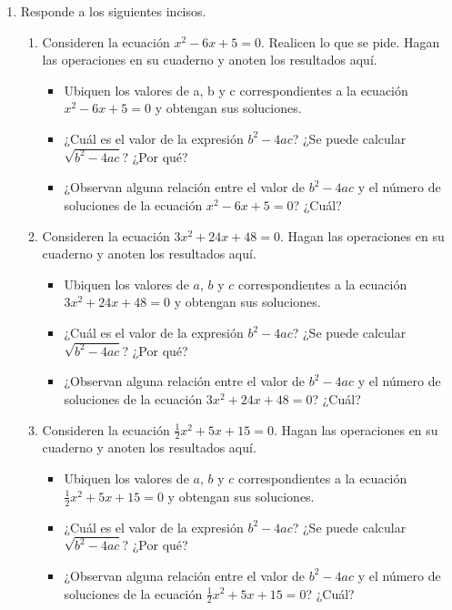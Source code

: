 \documentclass[11pt]{book}
\begin{document}
\begin{enumerate}
    \item Responde a los siguientes incisos.
          \begin{enumerate}
              \item Consideren la ecuación $x^2 - 6x + 5 = 0$. Realicen lo que se pide. Hagan las operaciones en su cuaderno y anoten los resultados aquí.
                    \begin{itemize}
                        \item Ubiquen los valores de a, b y c correspondientes a la ecuación $x^2 - 6x + 5 = 0$ y obtengan sus soluciones.
                        \item ¿Cuál es el valor de la expresión $b^2 - 4ac$? ¿Se puede calcular $\sqrt{b^2 - 4ac}$? ¿Por qué?
                        \item ¿Observan alguna relación entre el valor de $b^2 - 4ac$ y el número de soluciones de la ecuación $x^2 - 6x + 5 = 0$? ¿Cuál?
                    \end{itemize}

              \item Consideren la ecuación $3x^2 + 24x + 48 = 0$. Hagan las operaciones en su cuaderno y anoten los resultados aquí.
                    \begin{itemize}
                        \item Ubiquen los valores de $a$, $b$ y $c$ correspondientes a la ecuación $3x^2 + 24x + 48 = 0$ y obtengan sus soluciones.
                        \item ¿Cuál es el valor de la expresión $b^2 - 4ac$? ¿Se puede calcular $\sqrt{b^2 - 4ac}$? ¿Por qué?
                        \item ¿Observan alguna relación entre el valor de $b^2 - 4ac$ y el número de soluciones de la ecuación $3x^2 + 24x + 48 = 0$? ¿Cuál?
                    \end{itemize}

              \item Consideren la ecuación $\frac{1}{2}x^2 + 5x + 15 = 0$. Hagan las operaciones en su cuaderno y anoten los resultados aquí.
                    \begin{itemize}
                        \item Ubiquen los valores de $a$, $b$ y $c$ correspondientes a la ecuación $\frac{1}{2}x^2 + 5x + 15 = 0$ y obtengan sus soluciones.
                        \item ¿Cuál es el valor de la expresión $b^2 - 4ac$? ¿Se puede calcular $\sqrt{b^2 - 4ac}$? ¿Por qué?
                        \item ¿Observan alguna relación entre el valor de $b^2 - 4ac$ y el número de soluciones de la ecuación $\frac{1}{2}x^2 + 5x + 15 = 0$? ¿Cuál?
                    \end{itemize}
          \end{enumerate}


\end{enumerate}
\end{document}
